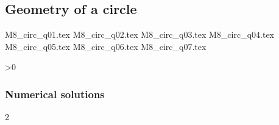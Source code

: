 \subsection{Geometry of a circle}

\begin{questions}

{M8_circ_q01.tex}
{M8_circ_q02.tex}
{M8_circ_q03.tex}
{M8_circ_q04.tex}
	\newpageWorkedSols{}
{M8_circ_q05.tex}	
	\newpageWorkedSols{}
{M8_circ_q06.tex}	
	\newpageWorkedSols{}
{M8_circ_q07.tex}	

\ifnum\value{printSols}>0
	\subsubsection*{Numerical solutions}
	\setcounter{solNo}{2}
	\begin{enumerate}
		\hlitem \printSolutionAndInc{} %
		\hlitem \printSolutionAndInc{} %
		\hlitem \printSolutionAndInc{} %
		\hlitem \printSolutionAndInc{} %
	\end{enumerate}
	\else
\fi

\end{questions}